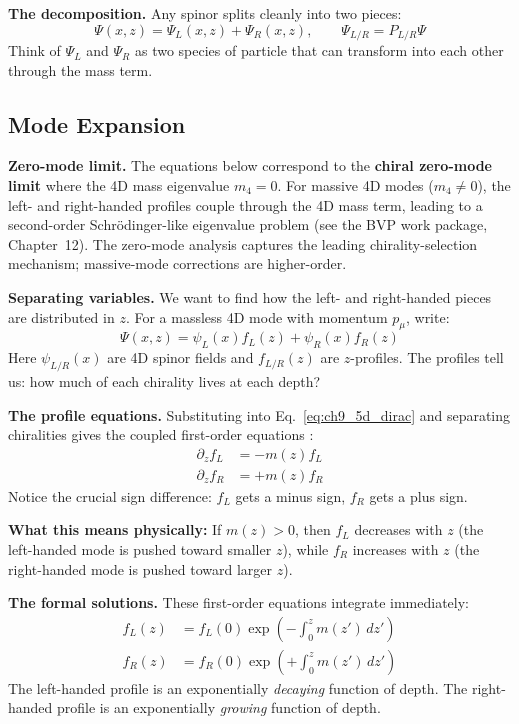 \textbf{The decomposition.} Any spinor splits cleanly into two pieces:
\begin{equation}
    \Psi(x,z) = \Psi_L(x,z) + \Psi_R(x,z), \qquad \Psi_{L/R} = P_{L/R} \Psi
    \label{eq:ch9_decomposition}
\end{equation}
Think of $\Psi_L$ and $\Psi_R$ as two species of particle that can transform into
each other through the mass term.

\subsection{Mode Expansion}

\textbf{Zero-mode limit.} The equations below correspond to the \textbf{chiral
zero-mode limit} where the 4D mass eigenvalue $m_4 = 0$. For massive 4D modes
($m_4 \neq 0$), the left- and right-handed profiles couple through the 4D mass
term, leading to a second-order Schrödinger-like eigenvalue problem (see the
BVP work package, Chapter~12). The zero-mode analysis captures the leading
chirality-selection mechanism; massive-mode corrections are higher-order.

\medskip
\textbf{Separating variables.} We want to find how the left- and right-handed
pieces are distributed in $z$. For a massless 4D mode with momentum $p_\mu$, write:
\begin{equation}
    \Psi(x,z) = \psi_L(x) f_L(z) + \psi_R(x) f_R(z)
    \label{eq:ch9_mode_expansion}
\end{equation}
Here $\psi_{L/R}(x)$ are 4D spinor fields and $f_{L/R}(z)$ are $z$-profiles.
The profiles tell us: how much of each chirality lives at each depth?

\textbf{The profile equations.} Substituting into Eq.~\eqref{eq:ch9_5d_dirac} and
separating chiralities gives the coupled first-order equations \tagBL{}:
\begin{align}
    \partial_z f_L &= -m(z) f_L \label{eq:ch9_fL_eq} \\
    \partial_z f_R &= +m(z) f_R \label{eq:ch9_fR_eq}
\end{align}
Notice the crucial sign difference: $f_L$ gets a minus sign, $f_R$ gets a plus sign.

\textbf{What this means physically:} If $m(z) > 0$, then $f_L$ decreases with $z$
(the left-handed mode is pushed toward smaller $z$), while $f_R$ increases with $z$
(the right-handed mode is pushed toward larger $z$).

\textbf{The formal solutions.} These first-order equations integrate immediately:
\begin{align}
    f_L(z) &= f_L(0) \exp\left(-\int_0^z m(z') \, dz'\right) \label{eq:ch9_fL_sol} \\
    f_R(z) &= f_R(0) \exp\left(+\int_0^z m(z') \, dz'\right) \label{eq:ch9_fR_sol}
\end{align}
The left-handed profile is an exponentially \emph{decaying} function of depth.
The right-handed profile is an exponentially \emph{growing} function of depth.

